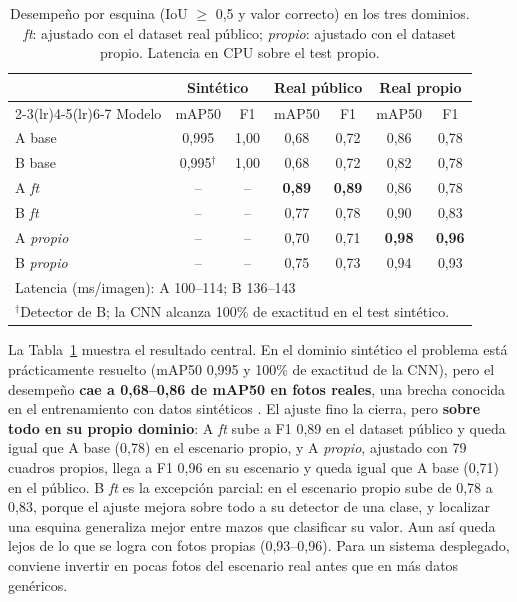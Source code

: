 \documentclass[conference,a4paper]{IEEEtran}
\begin{document}
\begin{table}[t]
\centering
\caption{Desempeño por esquina (IoU $\geq$ 0,5 y valor correcto) en los tres dominios. \emph{ft}: ajustado con el
dataset real público; \emph{propio}: ajustado con el dataset propio. Latencia en CPU sobre el test propio.}
\label{tab:dominios}
\setlength{\tabcolsep}{3.2pt}
\begin{tabular}{lcccccc}
\toprule
 & \multicolumn{2}{c}{Sintético} & \multicolumn{2}{c}{Real público} & \multicolumn{2}{c}{Real propio} \\
\cmidrule(lr){2-3}\cmidrule(lr){4-5}\cmidrule(lr){6-7}
Modelo & mAP50 & F1 & mAP50 & F1 & mAP50 & F1 \\
\midrule
A base       & 0,995 & 1,00 & 0,68 & 0,72 & 0,86 & 0,78 \\
B base       & 0,995$^\dagger$ & 1,00 & 0,68 & 0,72 & 0,82 & 0,78 \\
A \emph{ft}     & --    & --   & \textbf{0,89} & \textbf{0,89} & 0,86 & 0,78 \\
B \emph{ft}     & --    & --   & 0,77 & 0,78 & 0,90 & 0,83 \\
A \emph{propio} & --    & --   & 0,70 & 0,71 & \textbf{0,98} & \textbf{0,96} \\
B \emph{propio} & --    & --   & 0,75 & 0,73 & 0,94 & 0,93 \\
\midrule
\multicolumn{7}{l}{Latencia (ms/imagen): A 100--114; B 136--143} \\
\bottomrule
\multicolumn{7}{l}{\footnotesize $^\dagger$Detector de B; la CNN alcanza 100\% de exactitud en el test sintético.}
\end{tabular}
\end{table}

La Tabla~\ref{tab:dominios} muestra el resultado central. En el dominio sintético el problema está prácticamente
resuelto (mAP50 0,995 y 100\% de exactitud de la CNN), pero el desempeño \textbf{cae a 0,68--0,86 de mAP50 en fotos
reales}, una brecha conocida en el entrenamiento con datos sintéticos \cite{tremblay2018}. El ajuste fino la cierra,
pero \textbf{sobre todo en su propio dominio}: A \emph{ft} sube a F1 0,89 en el dataset público y queda igual que A base
(0,78) en el escenario propio, y A \emph{propio}, ajustado con 79 cuadros propios, llega a F1 0,96 en su escenario
y queda igual que A base (0,71) en el público. B \emph{ft} es la excepción parcial: en el escenario
propio sube de 0,78 a 0,83, porque el ajuste mejora sobre todo a su detector de una clase, y localizar una esquina
generaliza mejor entre mazos que clasificar su valor. Aun así queda lejos de lo que se logra con fotos propias
(0,93--0,96). Para un sistema desplegado, conviene invertir en pocas fotos del escenario real antes que en más datos
genéricos.
\end{document}
